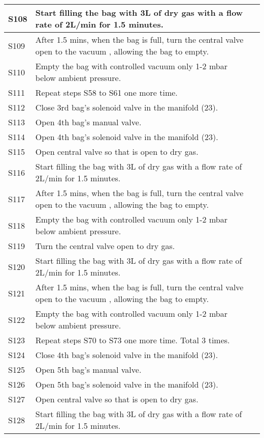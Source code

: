 \begin{longtable} {|m{}|m{}|m{}|}
S108 & Start filling the bag with 3L of dry gas with a flow rate of 2L/min for 1.5 minutes. & \\ \hline
S109 & After 1.5 mins, when the bag is full, turn the central valve open to the vacuum , allowing the bag to empty. & \\ \hline
S110 & Empty the bag with controlled vacuum only 1-2 mbar below ambient pressure. & \\ \hline
S111 & Repeat steps S58 to S61 one more time. & \\ \hline
S112 & Close 3rd bag's solenoid valve in the manifold (23). & \\ \hline
S113 & Open 4th bag's manual valve. & \\ \hline
S114 & Open 4th bag's solenoid valve in the manifold (23). & \\ \hline
S115 & Open central valve so that is open to dry gas. & \\ \hline
S116 & Start filling the bag with 3L of dry gas with a flow rate of 2L/min for 1.5 minutes. & \\ \hline
S117 & After 1.5 mins, when the bag is full, turn the central valve open to the vacuum , allowing the bag to empty. & \\ \hline
S118 & Empty the bag with controlled vacuum only 1-2 mbar below ambient pressure. & \\ \hline
S119 & Turn the central valve open to dry gas. & \\ \hline
S120 & Start filling the bag with 3L of dry gas with a flow rate of 2L/min for 1.5 minutes. & \\ \hline
S121 & After 1.5 mins, when the bag is full, turn the central valve open to the vacuum , allowing the bag to empty. & \\ \hline
S122 & Empty the bag with controlled vacuum only 1-2 mbar below ambient pressure. & \\ \hline
S123 & Repeat steps S70 to S73 one more time. Total 3 times. & \\ \hline
S124 & Close 4th bag's solenoid valve in the manifold (23). & \\ \hline
S125 & Open 5th bag's manual valve. & \\ \hline
S126 & Open 5th bag's solenoid valve in the manifold (23). & \\ \hline
S127 & Open central valve so that is open to dry gas. & \\ \hline
S128 & Start filling the bag with 3L of dry gas with a flow rate of 2L/min for 1.5 minutes. & \\ \hline

\end{longtable}
